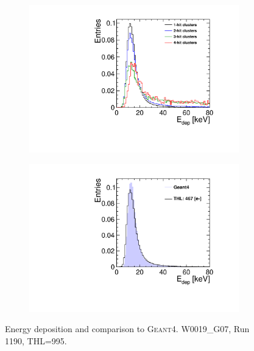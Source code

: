 \begin{figure}[htbp] \centering
  \begin{subfigure}[b]{0.45\textwidth}
    \includegraphics[width=\textwidth]{./figures/Calibration/Edep_Clusters_W0019_G07.pdf}
    \caption{}
  \end{subfigure}\hfill
  \begin{subfigure}[b]{0.45\textwidth}
    \includegraphics[width=\textwidth]{./figures/Calibration/Edep_G4_W0019_G07.pdf}
    \caption{}
  \end{subfigure}
  \caption{Energy deposition and comparison to
    \textsc{Geant4}. W0019\_G07, Run 1190, THL=995.}
  \label{fig:EdepW19L8}
\end{figure}


